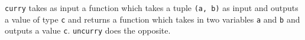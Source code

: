 
\verb|curry| takes as input a function which takes a tuple \verb|(a, b)| as input and 
outputs a value of type \verb|c| and returns a function which takes in two variables
\verb|a| and \verb|b| and outputs a value \verb|c|. \verb|uncurry| does the opposite.
